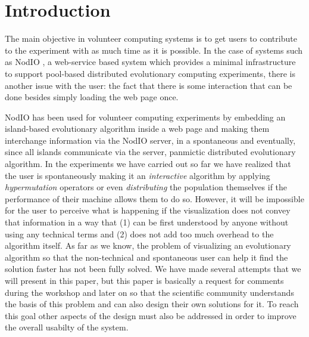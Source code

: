 \documentclass{sig-alternate}
\begin{document}


\section{Introduction}

The main objective in volunteer computing systems is to get
users to contribute to the experiment with as much time as it is
possible. In the case of systems such as NodIO \cite{DBLP:conf/gecco/GuervosG15}, 
a
web-service based system which
provides a minimal infrastructure to support pool-based distributed
evolutionary computing experiments, there is another issue with the 
user: the fact that there is some interaction that can be done besides
simply loading the web page once. 

NodIO 
has been used for volunteer computing experiments by
embedding an island-based evolutionary algorithm inside a web page and
making them interchange information via the NodIO server, in a
spontaneous and eventually, since all islands communicate via the
server, panmictic distributed evolutionary
algorithm. In the experiments we have carried out so far we have
realized %
that the user is spontaneously making it an {\em interactive}
algorithm %
by applying {\em hypermutation} 
operators or even {\em distributing} the population themselves if the 
performance of their machine allows them to do so. 
However, it will be impossible for the user to perceive what is
happening if the visualization does not convey that information in a
way that (1) can be first understood by anyone without using any technical
terms and (2) does not add too much overhead to the algorithm
itself. As far as we know, the problem of visualizing an evolutionary
algorithm so that the non-technical and spontaneous user can help it
find the solution faster has not been fully solved. We have made several
attempts that we will present in this paper, but this paper is
basically a request for comments during the workshop and later on so
that the scientific community understands the basis of this problem
and can also design their own solutions for it. To reach this goal
other aspects of the design must also be  addressed in order to
improve the overall usabilty of the system.
\end{document}

